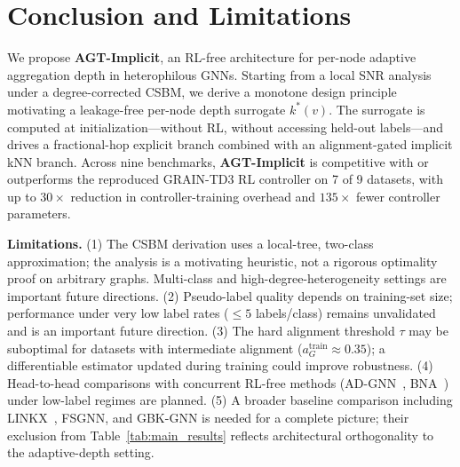 \documentclass[letterpaper]{article}
\newcommand{\methodname}{\textbf{AGT-Implicit}}
\begin{document}
\section{Conclusion and Limitations}
\label{sec:conclusion}

We propose \methodname, an RL-free architecture for per-node adaptive aggregation depth in heterophilous GNNs. Starting from a local SNR analysis under a degree-corrected CSBM, we derive a monotone design principle motivating a leakage-free per-node depth surrogate $k^*(v)$. The surrogate is computed at initialization---without RL, without accessing held-out labels---and drives a fractional-hop explicit branch combined with an alignment-gated implicit kNN branch. Across nine benchmarks, \methodname{} is competitive with or outperforms the reproduced GRAIN-TD3 RL controller on 7 of 9 datasets, with up to $30\times$ reduction in controller-training overhead and $135\times$ fewer controller parameters.

\textbf{Limitations.}
(1) The CSBM derivation uses a local-tree, two-class approximation; the analysis is a motivating heuristic, not a rigorous optimality proof on arbitrary graphs. Multi-class and high-degree-heterogeneity settings are important future directions.
(2) Pseudo-label quality depends on training-set size; performance under very low label rates ($\le 5$ labels/class) remains unvalidated and is an important future direction.
(3) The hard alignment threshold $\tau$ may be suboptimal for datasets with intermediate alignment ($a_G^{\mathrm{train}} \approx 0.35$); a differentiable estimator updated during training could improve robustness.
(4) Head-to-head comparisons with concurrent RL-free methods (AD-GNN~\cite{adgnn2025}, BNA~\cite{bna2026}) under low-label regimes are planned.
(5) A broader baseline comparison including LINKX~\cite{linkx2021}, FSGNN, and GBK-GNN is needed for a complete picture; their exclusion from Table~\ref{tab:main_results} reflects architectural orthogonality to the adaptive-depth setting.

\let\oldthebibliography\thebibliography
\let\oldendthebibliography\endthebibliography
\renewenvironment{thebibliography}[1]{%
  \begin{oldthebibliography}{#1}%
    \setlength{\itemsep}{0.0pt plus 0.1ex}%
    \setlength{\parsep}{0.0pt}%
    \setlength{\parskip}{0.0pt}%
}{%
  \end{oldthebibliography}%
}

\end{document}
